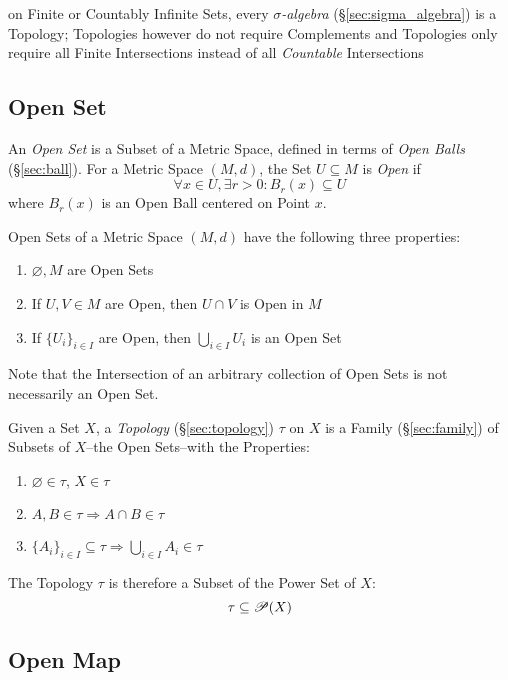 \fist on Finite or Countably Infinite Sets, every \emph{$\sigma$-algebra}
(\S\ref{sec:sigma_algebra}) is a Topology;
Topologies however do not require Complements and Topologies only require all
Finite Intersections instead of all \emph{Countable} Intersections



\subsection{Open Set}\label{sec:open_set}

An \emph{Open Set} is a Subset of a Metric Space, defined in terms of
\emph{Open Balls} (\S\ref{sec:ball}). For a Metric Space $(M,d)$, the
Set $U \subseteq M$ is \emph{Open} if
\[
  \forall x \in U, \exists r > 0 : B_r(x) \subseteq U
\]
where $B_r(x)$ is an Open Ball centered on Point $x$.

Open Sets of a Metric Space $(M,d)$ have the following three
properties:
\begin{enumerate}
\item $\varnothing, M$ are Open Sets
\item If $U, V \in M$ are Open, then $U \cap V$ is Open in $M$
\item If $\{ U_i \}_{i \in I}$ are Open, then $\bigcup_{i \in I}
  U_i$ is an Open Set
\end{enumerate}
\fist Note that the Intersection of an arbitrary collection of
Open Sets is not necessarily an Open Set.

Given a Set $X$, a \emph{Topology} (\S\ref{sec:topology}) $\tau$ on $X$ is a
Family (\S\ref{sec:family}) of Subsets of $X$--the Open Sets--with the
Properties:
\begin{enumerate}
  \item $\varnothing \in \tau$, $X \in \tau$
  \item $A,B \in \tau \Rightarrow A \cap B \in \tau$
  \item $\{A_i\}_{i \in I} \subseteq \tau \Rightarrow \bigcup_{i \in
  I} A_i \in \tau$
\end{enumerate}
The Topology $\tau$ is therefore a Subset of the Power Set of $X$:
\[
  \tau \subseteq \mathscr{P}(X)
\]



\subsection{Open Map}\label{sec:open_map}

